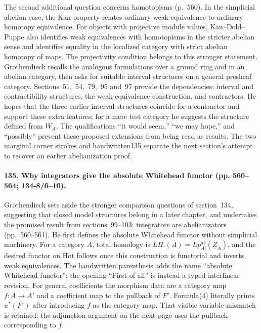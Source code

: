 The second additional question concerns homotopisms (p.~560). In the simplicial abelian case, the Kan property relates ordinary weak equivalence to ordinary homotopy equivalence. For objects with projective module values, Kan--Dold--Puppe also identifies weak equivalences with homotopisms in the stricter abelian sense and identifies equality in the localized category with strict abelian homotopy of maps. The projectivity condition belongs to this stronger statement. Grothendieck recalls the analogous formulations over a ground ring and in an abelian category, then asks for suitable interval structures on a general presheaf category. Sections~51,~54,~79,~95 and~97 provide the dependencies: interval and contractibility structures, the weak-equivalence construction, and contractors. He hopes that the three earlier interval structures coincide for a contractor and support these extra features; for a mere test category he suggests the structure defined from $W_A$. The qualifications ``it would seem,'' ``we may hope,'' and ``possibly'' prevent these proposed extensions from being read as results. The two marginal corner strokes and handwritten135 separate the next section's attempt to recover an earlier abelianization proof.

\paragraph{135. Why integrators give the absolute Whitehead functor (pp. 560--564; 134-8/6--10).}
Grothendieck sets aside the stronger comparison questions of section~134, suggesting that closed model structures belong in a later chapter, and undertakes the promised result from sections~99--103: integrators are abelianizators (pp.~560--561). He first defines the absolute Whitehead functor without simplicial machinery. For a category $A$, total homology is $LH.(A)=Lp^{ab}_{A!}(\underline Z_A)$, and the desired functor on $\mathrm{Hot}$ follows once this construction is functorial and inverts weak equivalences. The handwritten parenthesis adds the name ``absolute Whitehead functor''; the opening ``First of all'' is instead a typed interlinear revision. For general coefficients the morphism data are a category map $f:A\to A'$ and a coefficient map to the pullback of $F'$. Formula(4) literally prints $u^*(F')$ after introducing $f$ as the category map. That visible variable mismatch is retained; the adjunction argument on the next page uses the pullback corresponding to $f$.

